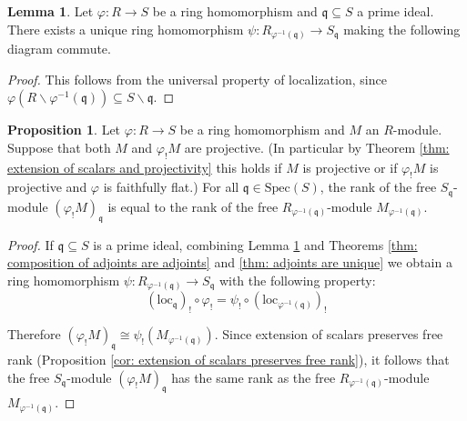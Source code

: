 \documentclass[oneside,11pt]{amsart}
\newcommand{\fq}{\ensuremath{\mathfrak{q}}}
\newcommand{\loc}{\ensuremath{\text{loc}}}
\newcommand{\Spec}{\ensuremath{\text{Spec}}}
\theoremstyle{definition}
\newtheorem{proof techniques}{Proof Techniques}
\newtheorem{lemma}{Lemma}
\newtheorem{proposition}{Proposition}
\begin{document}
\begin{lemma}\label{lem: localization and homomorphisms}
Let $\varphi : R \to S$ be a ring homomorphism and $\fq \subseteq S$ a prime ideal. There exists a unique ring homomorphism $\psi : R_{\varphi^{-1}(\fq)} \to S_\fq$ making the following diagram commute.

\begin{center}
\end{center}

\end{lemma}

\begin{proof}
This follows from the universal property of localization, since $\varphi(R \smallsetminus \varphi^{-1}(\fq) ) \subseteq S \smallsetminus \fq$. 
\end{proof}


\begin{proposition}\label{prop: rank and localizations of projective modules}
Let $\varphi : R \to S$ be a ring homomorphism and $M$ an $R$-module. Suppose that both $M$ and $\varphi_! M$ are projective. (In particular by Theorem \ref{thm: extension of scalars and projectivity} this holds if $M$ is projective or if $\varphi_! M$ is projective and $\varphi$ is faithfully flat.) For all $\fq \in \Spec(S)$, the rank of the free $S_\fq$-module $(\varphi_! M)_\fq$ is equal to the rank of the free $R_{\varphi^{-1}(\fq)}$-module $M_{\varphi^{-1}(\fq)}$.
\end{proposition}

\begin{proof}
If $\fq \subseteq S$ is a prime ideal, combining Lemma \ref{lem: localization and homomorphisms} and Theorems \ref{thm: composition of adjoints are adjoints} and \ref{thm: adjoints are unique} we obtain a ring homomorphism $\psi : R_{\varphi^{-1}(\fq)} \to S_\fq$ with the following property: 
\begin{equation*}
(\loc_\fq )_! \circ \varphi_! = \psi_! \circ (\loc_{\varphi^{-1}(\fq)})_!
\end{equation*}

Therefore $(\varphi_! M)_\fq \cong \psi_! ( M_{\varphi^{-1}(\fq)} )$. Since extension of scalars preserves free rank (Proposition \ref{cor: extension of scalars preserves free rank}), it follows that the free $S_\fq$-module $(\varphi_! M)_\fq$ has the same rank as the free $R_{\varphi^{-1}(\fq)}$-module $M_{\varphi^{-1}(\fq)}$.
\end{proof}
\end{document}
